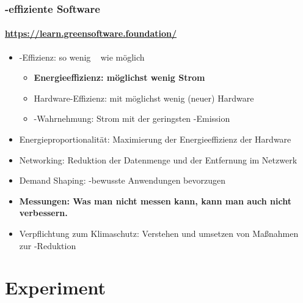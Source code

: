 \begin{frame}
\frametitle{\COz-effiziente Software}
\framesubtitle{\href{https://learn.greensoftware.foundation//}{https://learn.greensoftware.foundation/}}
\begin{itemize}
     \item \COz-Effizienz: so wenig \COz~  wie möglich
		 \begin{itemize}
         \item \textbf<2->{Energieeffizienz: möglichst wenig Strom} 
         \item Hardware-Effizienz:  mit möglichst wenig (neuer) Hardware
         \item \COz-Wahrnehmung:  Strom mit der geringsten \COz-Emission
     \end{itemize}
		\pause
    \item Energieproportionalität: Maximierung  der  Energieeffizienz der Hardware
    \item Networking: Reduktion der Datenmenge und der Entfernung im  Netzwerk
    \item Demand Shaping:  \COz-bewusste Anwendungen bevorzugen
    \item \textbf<2->{Messungen: Was man nicht messen kann, kann man auch nicht verbessern.} 
		\item Verpflichtung zum Klimaschutz: Verstehen und umsetzen von Maßnahmen zur \COz-Reduktion
\end{itemize}
\end{frame}

\section{Experiment}

